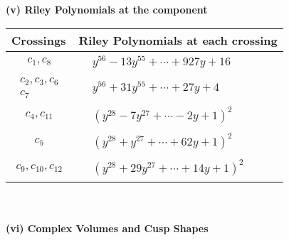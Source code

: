 \documentclass[1p]{elsarticle_modified}
\theoremstyle{definition}
\begin{document}
\newpage\renewcommand{\arraystretch}{1}
\flushleft \textbf{(v) Riley Polynomials at the component}\newline \\
\begin{tabular}{m{50pt}|m{274pt}}
Crossings & \hspace{64pt}Riley Polynomials at each crossing \\
\hline $$\begin{aligned}c_{1},c_{8}\end{aligned}$$&$\begin{aligned}
&y^{56}-13 y^{55}+\cdots+927 y+16
\end{aligned}$\\
\hline $$\begin{aligned}c_{2},c_{3},c_{6}\\c_{7}\end{aligned}$$&$\begin{aligned}
&y^{56}+31 y^{55}+\cdots+27 y+4
\end{aligned}$\\
\hline $$\begin{aligned}c_{4},c_{11}\end{aligned}$$&$\begin{aligned}
&(y^{28}-7 y^{27}+\cdots-2 y+1)^{2}
\end{aligned}$\\
\hline $$\begin{aligned}c_{5}\end{aligned}$$&$\begin{aligned}
&(y^{28}+y^{27}+\cdots+62 y+1)^{2}
\end{aligned}$\\
\hline $$\begin{aligned}c_{9},c_{10},c_{12}\end{aligned}$$&$\begin{aligned}
&(y^{28}+29 y^{27}+\cdots+14 y+1)^{2}
\end{aligned}$\\
\hline
\end{tabular}\\~\\
\newpage\flushleft \textbf{(vi) Complex Volumes and Cusp Shapes}
\end{document}
